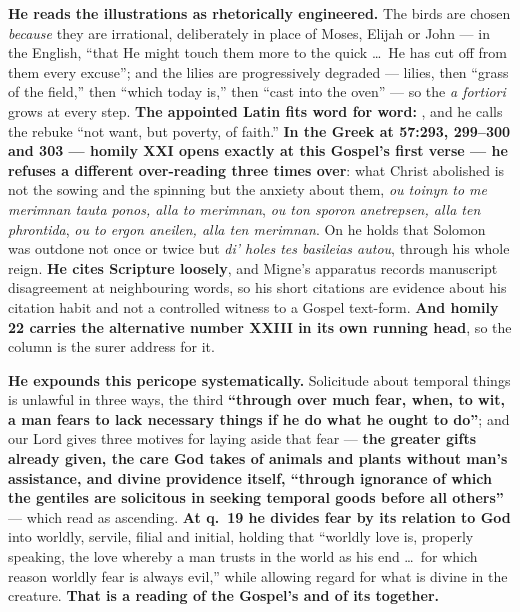 \begin{witnessnote}
 \textbf{He reads the illustrations as rhetorically
engineered.} The birds are chosen \emph{because} they are irrational,
deliberately in place of Moses, Elijah or John --- in the  English, ``that He might touch them more
to the quick \dots\ He has cut off from them every excuse''; and the lilies are
progressively degraded --- lilies, then ``grass of the field,'' then ``which
today is,'' then ``cast into the oven'' --- so the \emph{a fortiori} grows at
every step. \textbf{The appointed Latin fits word for word:} , and he calls the rebuke ``not want, but poverty, of faith.''
\textbf{In the Greek at  57:293, 299--300 and
303 --- homily XXI opens exactly at this Gospel's first verse --- he refuses a
different over-reading three times over}: what Christ abolished is not the
sowing and the spinning but the anxiety about them, \emph{ou toinyn to me
merimnan tauta ponos, alla to merimnan}, \emph{ou ton sporon anetrepsen, alla
ten phrontida}, \emph{ou to ergon aneilen, alla ten merimnan}. On
 he holds that Solomon was outdone not
once or twice but \emph{di' holes tes basileias autou}, through his whole reign.
\textbf{He cites Scripture loosely}, and Migne's apparatus records manuscript
disagreement at neighbouring words, so his short citations are evidence about
his citation habit and not a controlled witness to a Gospel text-form.
\textbf{And homily 22 carries the alternative number XXIII in its own running
head}, so the column is the surer address for it.
\end{witnessnote}

\begin{witnessnote}
\textbf{He expounds this pericope systematically.} Solicitude about temporal
things is unlawful in three ways, the third \textbf{``through over much fear,
when, to wit, a man fears to lack necessary things if he do what he ought to
do''}; and our Lord gives three motives for laying aside that fear ---
\textbf{the greater gifts already given, the care God takes of animals and
plants without man's assistance, and divine providence itself, ``through
ignorance of which the gentiles are solicitous in seeking temporal goods before
all others''} --- which read as ascending. \textbf{At q.~19 he divides fear by
its relation to God} into worldly, servile, filial and initial, holding that
``worldly love is, properly speaking, the love whereby a man trusts in the world
as his end \dots\ for which reason worldly fear is always evil,'' while allowing
regard for what is divine in the creature. \textbf{That is a reading of the
Gospel's  and of its  together.}
\end{witnessnote}

